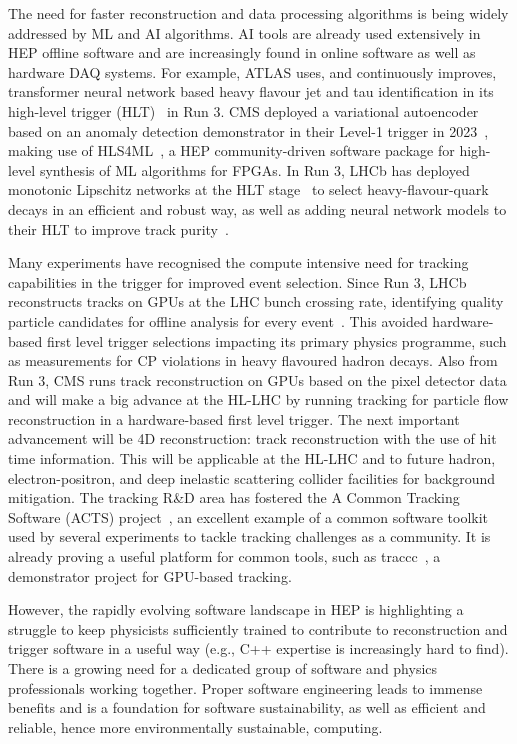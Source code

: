 \documentclass[10pt,a4paper]{article}
\begin{document}
The need for faster reconstruction and data processing algorithms is being
widely addressed by ML and AI algorithms. AI tools are already used extensively
in HEP offline software and are increasingly found in online software as well as
hardware DAQ systems. For example, ATLAS uses, and continuously improves, transformer 
neural network based heavy flavour jet and tau identification in its high-level
trigger (HLT)~\cite{ATLAS:perf_commissioning} in Run 3.
CMS deployed a variational autoencoder based on
an anomaly detection demonstrator in their Level-1 trigger in 2023~\cite{CMS-DP-2023-079},
making use of HLS4ML~\cite{fastml_team_hls4ml}, a HEP community-driven
software package for high-level synthesis of ML algorithms for FPGAs. In Run 3,
LHCb has deployed monotonic Lipschitz networks at the HLT
stage~\cite{LHCb:Lipschitz} to select heavy-flavour-quark decays in an efficient
and robust way, as well as adding neural network models to their HLT to
improve track purity~\cite{neuralmodelHLT1LHCb}.

Many experiments have recognised the compute intensive need for tracking
capabilities in the trigger for improved event selection. Since Run 3, LHCb
reconstructs tracks on GPUs at the LHC bunch crossing rate, identifying quality
particle candidates for offline analysis for every event~\cite{LHCb:HLT}. This
avoided hardware-based first level trigger selections impacting its primary
physics programme, such as measurements for CP violations in heavy flavoured
hadron decays. Also from Run 3, CMS runs track reconstruction on GPUs based on the
pixel detector data and will make a big advance at the HL-LHC
by running tracking for particle flow reconstruction in a hardware-based
first level trigger. The next important advancement will be 4D reconstruction:
track reconstruction with the use of hit time information. This will be
applicable at the HL-LHC and to future hadron, electron-positron, and deep
inelastic scattering collider facilities for background mitigation. The tracking
R\&D area has fostered the A Common Tracking Software (ACTS) project~\cite{Ai2022Common},
an excellent example of a common software toolkit used by several experiments to
tackle tracking challenges as a community. It is already proving a useful
platform for common tools, such as traccc~\cite{yeo_2023_8119769, traccc}, a
demonstrator project for GPU-based tracking.

However, the rapidly evolving software landscape in HEP is highlighting a
struggle to keep physicists sufficiently trained to contribute to reconstruction
and trigger software in a useful way (e.g., C++ expertise is increasingly hard to find). 
There is a growing need for a dedicated group of software and
physics professionals working together. Proper software engineering leads to
immense benefits and is a foundation for software sustainability, as well as
efficient and reliable, hence more environmentally sustainable, computing.
\end{document}

